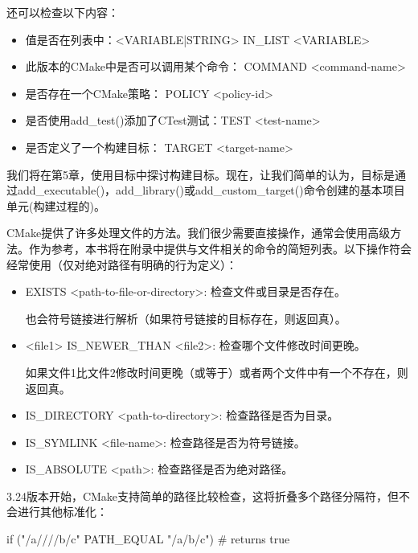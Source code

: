 还可以检查以下内容：

\begin{itemize}
\item
值是否在列表中：<VARIABLE|STRING> IN\_LIST <VARIABLE>

\item
此版本的CMake中是否可以调用某个命令： COMMAND <command-name>

\item
是否存在一个CMake策略： POLICY <policy-id>

\item
是否使用add\_test()添加了CTest测试：TEST <test-name>

\item
是否定义了一个构建目标： TARGET <target-name>
\end{itemize}

我们将在第5章，使用目标中探讨构建目标。现在，让我们简单的认为，目标是通过add\_executable()，add\_library()或add\_custom\_target()命令创建的基本项目单元(构建过程的)。


CMake提供了许多处理文件的方法。我们很少需要直接操作，通常会使用高级方法。作为参考，本书将在附录中提供与文件相关的命令的简短列表。以下操作符会经常使用（仅对绝对路径有明确的行为定义）：

\begin{itemize}
\item
EXISTS <path-to-file-or-directory>: 检查文件或目录是否存在。

也会符号链接进行解析（如果符号链接的目标存在，则返回真）。

\item
<file1> IS\_NEWER\_THAN <file2>: 检查哪个文件修改时间更晚。

如果文件1比文件2修改时间更晚（或等于）或者两个文件中有一个不存在，则返回真。

\item
IS\_DIRECTORY <path-to-directory>: 检查路径是否为目录。

\item
IS\_SYMLINK <file-name>: 检查路径是否为符号链接。

\item
IS\_ABSOLUTE <path>: 检查路径是否为绝对路径。
\end{itemize}

3.24版本开始，CMake支持简单的路径比较检查，这将折叠多个路径分隔符，但不会进行其他标准化：

\begin{cmake}
if ("/a////b/c" PATH_EQUAL "/a/b/c") # returns true
\end{cmake}

